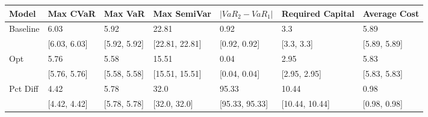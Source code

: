 \begin{tabular}{lllllll}
\toprule
   Model &     Max CVaR &      Max VaR &    Max SemiVar & $|VaR_2 - VaR_1|$ & Required Capital & Average Cost \\
\midrule
Baseline &         6.03 &         5.92 &          22.81 &              0.92 &              3.3 &         5.89 \\
         & [6.03, 6.03] & [5.92, 5.92] & [22.81, 22.81] &      [0.92, 0.92] &       [3.3, 3.3] & [5.89, 5.89] \\
     Opt &         5.76 &         5.58 &          15.51 &              0.04 &             2.95 &         5.83 \\
         & [5.76, 5.76] & [5.58, 5.58] & [15.51, 15.51] &      [0.04, 0.04] &     [2.95, 2.95] & [5.83, 5.83] \\
Pct Diff &         4.42 &         5.78 &           32.0 &             95.33 &            10.44 &         0.98 \\
         & [4.42, 4.42] & [5.78, 5.78] &   [32.0, 32.0] &    [95.33, 95.33] &   [10.44, 10.44] & [0.98, 0.98] \\
\bottomrule
\end{tabular}
